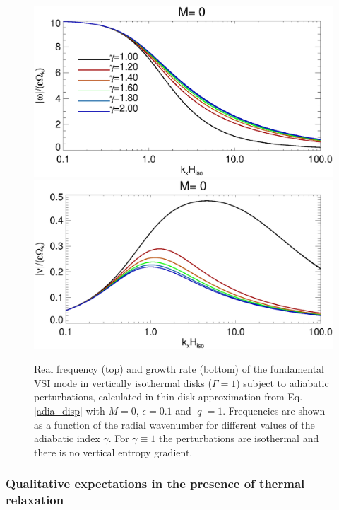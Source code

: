 \begin{figure}
  \includegraphics[width=\linewidth,clip=true,trim=0cm 1.75cm 0cm 0cm]{figures/rate_theory_om}
  \includegraphics[width=\linewidth,clip=true,trim=0cm 0cm 0cm 1cm]{figures/rate_theory_nu}
  \caption{Real frequency (top) and growth rate (bottom) of the fundamental VSI mode in vertically 
    isothermal disks ($\Gamma=1$) subject to adiabatic perturbations,
    calculated in thin disk approximation from Eq. \ref{adia_disp}
    with $M=0$, $\epsilon=0.1$ and  
    $|q|=1$. Frequencies are shown as a function of the radial
    wavenumber for different values of the adiabatic index
    $\gamma$. For $\gamma\equiv 1$ the perturbations are isothermal
    and there is no vertical entropy gradient.\label{adia_growth}}  
\end{figure}   

\subsubsection{Qualitative expectations in the presence of thermal
  relaxation}
